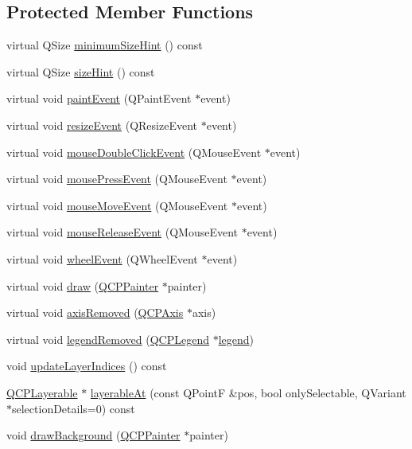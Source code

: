 \subsection*{Protected Member Functions}
\begin{DoxyCompactItemize}
\item 
virtual Q\+Size \hyperlink{class_q_custom_plot_a4904f06d831afae29cd5d10e889388c3}{minimum\+Size\+Hint} () const 
\item 
virtual Q\+Size \hyperlink{class_q_custom_plot_a21d84d299c3651ec36d11a7826274a3c}{size\+Hint} () const 
\item 
virtual void \hyperlink{class_q_custom_plot_a2bbc3b1c24bfcc8a7cc1f3008cdd9b73}{paint\+Event} (Q\+Paint\+Event $\ast$event)
\item 
virtual void \hyperlink{class_q_custom_plot_a13e05523a40c3f08875df5cde85cf0d9}{resize\+Event} (Q\+Resize\+Event $\ast$event)
\item 
virtual void \hyperlink{class_q_custom_plot_a77591913a5b543bdc465dd5e08325a49}{mouse\+Double\+Click\+Event} (Q\+Mouse\+Event $\ast$event)
\item 
virtual void \hyperlink{class_q_custom_plot_abce84fa2c71e47b9295d67e8fce84bb4}{mouse\+Press\+Event} (Q\+Mouse\+Event $\ast$event)
\item 
virtual void \hyperlink{class_q_custom_plot_ac64727a4f442770f6e5e6be2d0530843}{mouse\+Move\+Event} (Q\+Mouse\+Event $\ast$event)
\item 
virtual void \hyperlink{class_q_custom_plot_a724e97d2e8c03e68adac5f4b6164a1b3}{mouse\+Release\+Event} (Q\+Mouse\+Event $\ast$event)
\item 
virtual void \hyperlink{class_q_custom_plot_a7b8bd7e8d3a1d23a8595e9c6a6b76ef1}{wheel\+Event} (Q\+Wheel\+Event $\ast$event)
\item 
virtual void \hyperlink{class_q_custom_plot_ad7a7d878bf050f101a43008e7d8fdb52}{draw} (\hyperlink{class_q_c_p_painter}{Q\+C\+P\+Painter} $\ast$painter)
\item 
virtual void \hyperlink{class_q_custom_plot_a8b46607021c463c94709d3504951cb47}{axis\+Removed} (\hyperlink{class_q_c_p_axis}{Q\+C\+P\+Axis} $\ast$axis)
\item 
virtual void \hyperlink{class_q_custom_plot_a9d173454555021c9ffd4f675c4d9037a}{legend\+Removed} (\hyperlink{class_q_c_p_legend}{Q\+C\+P\+Legend} $\ast$\hyperlink{class_q_custom_plot_a4eadcd237dc6a09938b68b16877fa6af}{legend})
\item 
void \hyperlink{class_q_custom_plot_a3117754df3a5638787a6223c7147970f}{update\+Layer\+Indices} () const 
\item 
\hyperlink{class_q_c_p_layerable}{Q\+C\+P\+Layerable} $\ast$ \hyperlink{class_q_custom_plot_a3fffd1d8364f657482ae985e0b5aa028}{layerable\+At} (const Q\+Point\+F \&pos, bool only\+Selectable, Q\+Variant $\ast$selection\+Details=0) const 
\item 
void \hyperlink{class_q_custom_plot_a05dd52438cee4353b18c1e53a439008d}{draw\+Background} (\hyperlink{class_q_c_p_painter}{Q\+C\+P\+Painter} $\ast$painter)
\end{DoxyCompactItemize}
